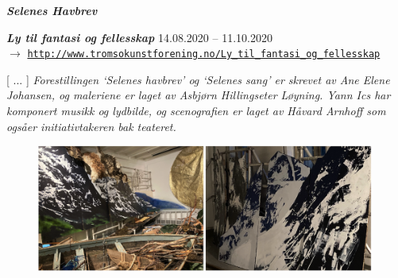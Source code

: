 \newpage 

{\Large \textsl{\textbf{Selenes Havbrev}}}

\bigskip

\noindent \textbf{\textsl{Ly til fantasi og fellesskap}} 14.08.2020 -- 11.10.2020 \vspace{1mm} \\ 
$\rightarrow$ \href{http://www.tromsokunstforening.no/default.asp?cmd=100&UtsID=200}{\texttt{\footnotesize http://www.tromsokunstforening.no/Ly\_til\_fantasi\_og\_fellesskap}} 

\bigskip

[ ... ] \textsl{Forestillingen `Selenes havbrev' og `Selenes sang' er skrevet av Ane Elene Johansen, og maleriene er laget av Asbj\o{}rn Hillingseter L\o{}yning. Yann Ics har komponert musikk og lydbilde, og scenografien er laget av H\aa vard Arnhoff som ogs\aa  er initiativtakeren bak teateret.}

\smallskip

\begin{figure}[h]
	\begin{center}
		\includegraphics[width=0.99\textwidth]{mp/img/img2}
		\label{sh}
	\end{center}
\end{figure}

